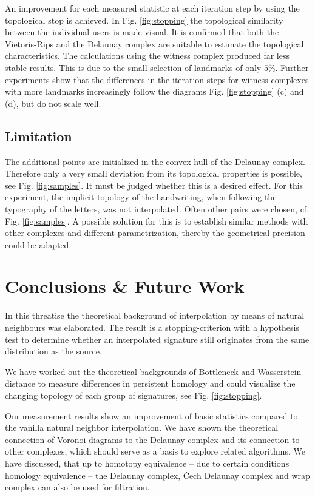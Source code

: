 \documentclass[journal]{IEEEtran}
\begin{document}
An improvement for each measured statistic at each iteration step by using the topological stop is achieved. In Fig. \ref{fig:stopping} the topological similarity between the individual users is made visual. It is confirmed that both the Vietoris-Rips and the Delaunay complex are suitable to estimate the topological characteristics. The calculations using the witness complex produced far less stable results. This is due to the small selection of landmarks of only $5\%$. Further experiments show that the differences in the iteration steps for witness complexes with more landmarks increasingly follow the diagrams Fig. \ref{fig:stopping} (c) and (d), but do not scale well.


\subsection{Limitation}
\label{limit}
The additional points are initialized in the convex hull of the Delaunay complex. Therefore only a very small deviation from its topological properties is possible, see Fig. \ref{fig:samples}. It must be judged whether this is a desired effect. For this experiment, the implicit topology of the handwriting, when following the typography of the letters, was not interpolated. Often other pairs were chosen, cf. Fig. \ref{fig:samples}. A possible solution for this is to establish similar methods with other complexes and different parametrization, thereby the geometrical precision could be adapted.

\section{Conclusions \& Future Work}
\label{sec:conclusion}
In this threatise the theoretical background of interpolation by means of natural neighbours was elaborated. The result is a stopping-criterion with a hypothesis test to determine whether an interpolated signature still originates from the same distribution as the source.

We have worked out the theoretical backgrounds of Bottleneck and Wasserstein distance to measure differences in persistent homology and could visualize the changing topology of each group of signatures, see Fig. \ref{fig:stopping}.

Our measurement results show an improvement of basic statistics compared to the vanilla natural neighbor interpolation. We have shown the theoretical connection of Voronoi diagrams to the Delaunay complex and its connection to other complexes, which should serve as a basis to explore related algorithms. We have discussed, that up to homotopy equivalence -- due to certain conditions homology equivalence -- the Delaunay complex, \v{C}ech Delaunay complex and wrap complex can also be used for filtration.
\end{document}
